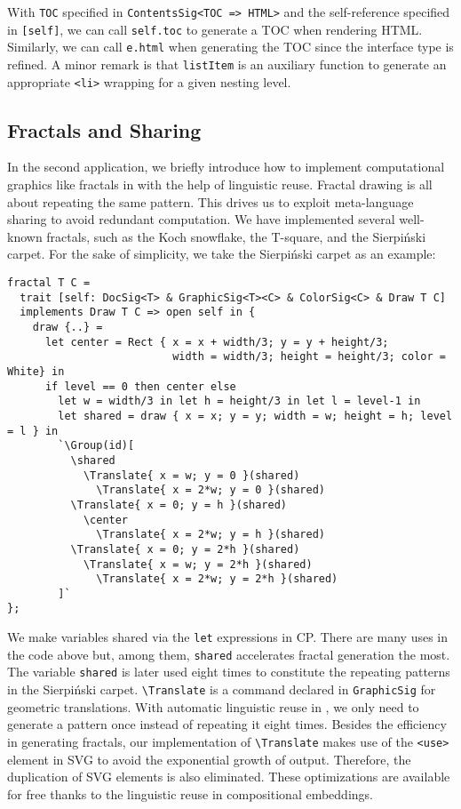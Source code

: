 \noindent With \lstinline{TOC} specified in \lstinline{ContentsSig<TOC => HTML>}
and the self-reference specified in \lstinline{[self]}, we can call
\lstinline{self.toc} to generate a TOC when rendering HTML. Similarly, we can
call \lstinline{e.html} when generating the TOC since the interface type is
refined. A minor remark is that \lstinline{listItem} is an auxiliary function to
generate an appropriate \lstinline{<li>} wrapping for a given nesting level.

\subsection{Fractals and Sharing} \label{sec:fractal}

In the second application, we briefly introduce how to implement computational
graphics like fractals in \ExT with the help of linguistic reuse. Fractal
drawing is all about repeating the same pattern. This drives us to exploit
meta-language sharing to avoid redundant computation. We have implemented
several well-known fractals, such as the Koch snowflake, the T-square, and the
Sierpiński carpet. For the sake of simplicity, we take the Sierpiński carpet as
an example:

\begin{lstlisting}
fractal T C =
  trait [self: DocSig<T> & GraphicSig<T><C> & ColorSig<C> & Draw T C]
  implements Draw T C => open self in {
    draw {..} =
      let center = Rect { x = x + width/3; y = y + height/3;
                          width = width/3; height = height/3; color = White} in
      if level == 0 then center else
        let w = width/3 in let h = height/3 in let l = level-1 in
        let shared = draw { x = x; y = y; width = w; height = h; level = l } in
        `\Group(id)[
          \shared
            \Translate{ x = w; y = 0 }(shared)
              \Translate{ x = 2*w; y = 0 }(shared)
          \Translate{ x = 0; y = h }(shared)
            \center
              \Translate{ x = 2*w; y = h }(shared)
          \Translate{ x = 0; y = 2*h }(shared)
            \Translate{ x = w; y = 2*h }(shared)
              \Translate{ x = 2*w; y = 2*h }(shared)
        ]`
};
\end{lstlisting}

\noindent We make variables shared via the \lstinline{let} expressions in CP.
There are many uses in the code above but, among them, \lstinline{shared}
accelerates fractal generation the most. The variable \lstinline{shared} is
later used eight times to constitute the repeating patterns in the Sierpiński
carpet. \lstinline{\Translate} is a command declared in \lstinline{GraphicSig}
for geometric translations. With automatic linguistic reuse in \ExT, we only
need to generate a pattern once instead of repeating it eight times. Besides the
efficiency in generating fractals, our implementation of \lstinline{\Translate}
makes use of the \lstinline{<use>} element in SVG to avoid the exponential
growth of output. Therefore, the duplication of SVG elements is also eliminated.
These optimizations are available for free thanks to the linguistic reuse in
compositional embeddings.

